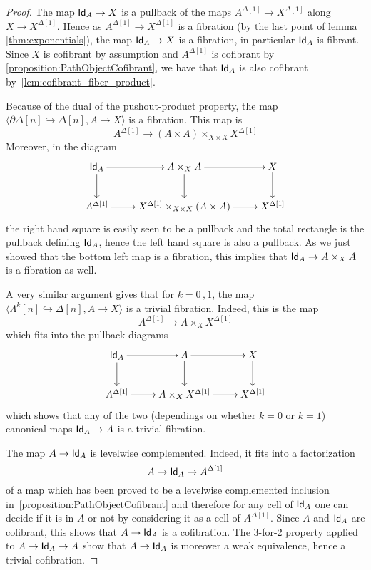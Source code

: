 \documentclass[reqno,10pt,a4paper,oneside,draft]{amsart}
\begin{document}
\begin{proof}

The map $\mathsf{Id}_A \rightarrow X$ is a pullback of the maps $A^{\Delta[1]} \rightarrow X^{\Delta[1]}$ along $X \rightarrow X^{\Delta[1]}$. Hence as $A^{\Delta[1]} \rightarrow X^{\Delta[1]}$ is a fibration (by the last point of lemma \ref{thm:exponentials}), the map $\mathsf{Id}_A \rightarrow X$ is a fibration, in particular $\mathsf{Id}_A$ is fibrant. Since $X$ is cofibrant by assumption and $A^{\Delta[1]}$ is  cofibrant by \cref{proposition:PathObjectCofibrant}, we have that $\mathsf{Id}_A$ is also cofibrant by~\cref{lem:cofibrant_fiber_product}. 

Because of the dual of the pushout-product property, the map $\langle \partial \Delta[n] \hookrightarrow \Delta[n] ,  A \rightarrow X \rangle$ is a fibration. This map is 
\[ 
A^{\Delta[1]} \rightarrow (A \times A) \times_{X \times X} X^{\Delta[1]} 
\] 
Moreover, in the diagram
\[
\xymatrix{
\Id_A \ar[r] \ar[d] & A \times_{X} A \ar[d] \ar[r] & X \ar[d] \\
A^{\Delta[1]} \ar[r] & X^{\Delta[1]}  \times_{X \times X}  (A \times A) \ar[r]  & X^{\Delta[1]}
}
 \]
the right hand square is easily seen to be a pullback and the total rectangle is the pullback defining $\mathsf{Id}_A$, hence the left hand square is also a pullback. As we just showed that the bottom left map is a fibration, this implies that $\mathsf{Id}_A \rightarrow A \times_{X} A$ is a fibration as well.

A very similar argument gives that for $k=0 \, , 1$, the map $\langle \Lambda^k[n] \hookrightarrow \Delta[n] ,  A \rightarrow X\rangle$ is a trivial fibration. Indeed, this is the map
\[ 
A^{\Delta[1]} \rightarrow  A  \times_X X^{\Delta[1]} 
\] 
which fits into the pullback diagrams
\[
\xymatrix{
\Id_A \ar[r] \ar[d] & A  \ar[d] \ar[r] & X \ar[d] \\
A^{\Delta[1]} \ar[r] & A \times_X X^{\Delta[1]} \ar[r]  & X^{\Delta[1]}
}
 \]
which  shows that any of the two (dependings on whether $k=0$ or $k=1$) canonical maps $\mathsf{Id}_A \rightarrow A$ is a trivial fibration.

The map $A \rightarrow \mathsf{Id}_A$ is levelwise complemented. Indeed, it fits into a factorization 
\[
A \rightarrow \mathsf{Id}_A \rightarrow A^{\Delta[1]}
\] 
of a map which has been proved to be a levelwise complemented inclusion in~\cref{proposition:PathObjectCofibrant} and therefore for any cell of $\mathsf{Id}_A$ one can decide if it is in $A$ or not by considering it as a cell of $A^{\Delta[1]}$. Since $A$ and $\mathsf{Id}_A$ are cofibrant, this shows that $A \rightarrow \mathsf{Id}_A$ is a cofibration. The 3-for-2 property applied to $A \rightarrow \mathsf{Id}_A \rightarrow A$ show that  $A \rightarrow \mathsf{Id}_A$ is moreover a weak equivalence, hence a trivial cofibration.
\end{proof}
\end{document}
